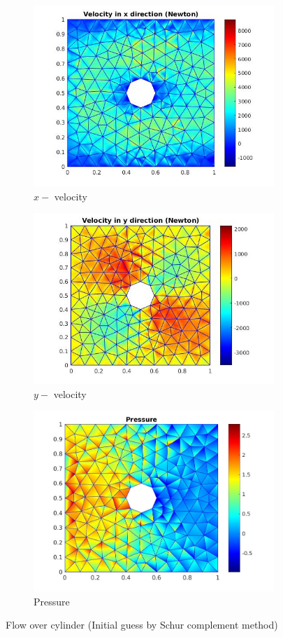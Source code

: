 \documentclass[a4paper,twoside,openright]{book}
\begin{document}
\begin{figure}
  \begin{subfigure}{\textwidth}
    \includegraphics[width=0.8\linewidth]{cylinder_newton_vx_schur.jpg}
    \caption{$x-$ velocity}
  \label{x_vel_navier_stoke_schur}
  \end{subfigure}
  \begin{subfigure}{\textwidth}
    \includegraphics[width=0.8\linewidth]{cylinder_newton_vy_schur.jpg}
    \caption{$y-$ velocity}
  \label{y_vel_navier_stoke_schur}
  \end{subfigure}
  \begin{subfigure}{\textwidth}
    \includegraphics[width=0.8\linewidth]{cylinder_newton_pressure_schur.jpg}
    \caption{Pressure}
  \label{pressure_navier_stoke_schur}
  \end{subfigure}
\caption{Flow over cylinder (Initial guess by Schur complement method)}
\label{flow_over_cylinder_schur_n_s}
\end{figure}
\end{document}
